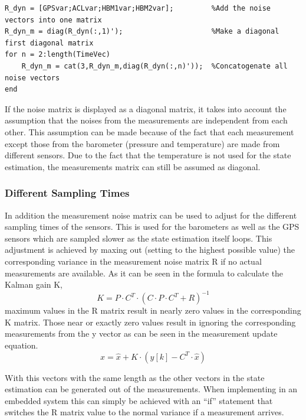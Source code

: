 \begin{lstlisting}[caption={Mesurements noise matrix conagonating}]
R_dyn = [GPSvar;ACLvar;HBM1var;HBM2var];         %Add the noise vectors into one matrix
R_dyn_m = diag(R_dyn(:,1)');                     %Make a diagonal first diagonal matrix
for n = 2:length(TimeVec)
    R_dyn_m = cat(3,R_dyn_m,diag(R_dyn(:,n)'));  %Concatogenate all noise vectors
end
\end{lstlisting}


If the noise matrix is displayed as a diagonal matrix,
it takes into account the assumption that the noises from the measurements are independent from each other.
This assumption can be made because of the fact that each measurement except those from the barometer (pressure and temperature) are made from different sensors.
Due to the fact that the temperature is not used for the state estimation, the measurements matrix can still be assumed as diagonal.

\subsubsection{Different Sampling Times}
In addition the measurement noise matrix can be used to adjust for the different sampling times of the sensors.
This is used for the barometers as well as the GPS sensors which are sampled slower as the state estimation itself loops.
This adjustment is achieved by maxing out (setting to the highest possible value) the corresponding variance in the measurement noise matrix R if no actual measurements are available.
As it can be seen in the formula to calculate the Kalman gain K,
$$  K = P\cdot C^T\cdot (C\cdot P\cdot C^T + R)^{-1} $$
maximum values in the R matrix result in nearly zero values in the corresponding K matrix.
Those near or exactly zero values result in ignoring the corresponding measurements from the y vector as can be seen in the measurement update equation.
$$  x = \hat{x} + K\cdot(y[k] - C^T \cdot \hat{x}) $$

With this vectors with the same length as the other vectors in the state estimation can be generated out of the measurements.
When implementing in an embedded system this can simply be achieved with an ``if'' statement that switches the R matrix value to the normal variance if a measurement arrives.

